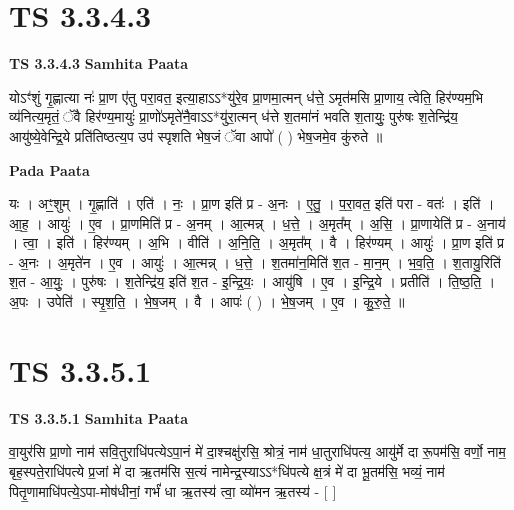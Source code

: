 \documentclass[17pt]{extarticle}
\begin{document}
\section*{ TS 3.3.4.3 }

\textbf{TS 3.3.4.3 } \newline
\textbf{Samhita Paata} \newline

योऽꣳ॑शुं गृ॒ह्णात्या नः॑ प्रा॒ण ए॑तु परा॒वत॒ इत्या॒हाऽऽ*यु॑रे॒व प्रा॒णमा॒त्मन् ध॑त्ते॒ ऽमृत॑मसि प्रा॒णाय॒ त्वेति॒ हिर॑ण्यम॒भि व्य॑नित्य॒मृतं॒ ॅवै हिर॑ण्य॒मायुः॑ प्रा॒णो॑ऽमृते॑नै॒वाऽऽ*यु॑रा॒त्मन् ध॑त्ते श॒तमा॑नं भवति श॒तायुः॒ पुरु॑षः श॒तेन्द्रि॑य॒ आयु॑ष्ये॒वेन्द्रि॒ये प्रति॑तिष्ठत्य॒प उप॑ स्पृशति भेष॒जं ॅवा आपो॑ ( ) भेष॒जमे॒व कु॑रुते ॥ \newline

\textbf{Pada Paata} \newline

यः । अꣳ॒॒शुम् । गृ॒ह्णाति॑ । एति॑ । नः॒ । प्रा॒ण इति॑ प्र - अ॒नः । ए॒तु॒ । प॒रा॒वत॒ इति॑ परा - वतः॑ । इति॑ । आ॒ह॒ । आयुः॑ । ए॒व । प्रा॒णमिति॑ प्र - अ॒नम् । आ॒त्मन्न् । ध॒त्ते॒ । अ॒मृत᳚म् । अ॒सि॒ । प्रा॒णायेति॑ प्र - अ॒नाय॑ । त्वा॒ । इति॑ । हिर॑ण्यम् । अ॒भि । वीति॑ । अ॒नि॒ति॒ । अ॒मृत᳚म् । वै । हिर॑ण्यम् । आयुः॑ । प्रा॒ण इति॑ प्र - अ॒नः । अ॒मृते॑न । ए॒व । आयुः॑ । आ॒त्मन्न् । ध॒त्ते॒ । श॒तमा॑न॒मिति॑ श॒त - मा॒न॒म् । भ॒व॒ति॒ । श॒तायु॒रिति॑ श॒त - आ॒युः॒ । पुरु॑षः । श॒तेन्द्रि॑य॒ इति॑ श॒त - इ॒न्द्रि॒यः॒ । आयु॑षि । ए॒व । इ॒न्द्रि॒ये । प्रतीति॑ । ति॒ष्ठ॒ति॒ । अ॒पः । उपेति॑ । स्पृ॒श॒ति॒ । भे॒ष॒जम् । वै । आपः॑ ( ) । भे॒ष॒जम् । ए॒व । कु॒रु॒ते॒ ॥  \newline




\section*{ TS 3.3.5.1 }

\textbf{TS 3.3.5.1 } \newline
\textbf{Samhita Paata} \newline

वा॒युर॑सि प्रा॒णो नाम॑ सवि॒तुराधि॑पत्येऽपा॒नं मे॑ दा॒श्चक्षु॑रसि॒ श्रोत्रं॒ नाम॑ धा॒तुराधि॑पत्य॒ आयु॑र्मे दा रू॒पम॑सि॒ वर्णो॒ नाम॒ बृह॒स्पते॒राधि॑पत्ये प्र॒जां मे॑ दा ऋ॒तम॑सि स॒त्यं नामेन्द्र॒स्याऽऽ*धि॑पत्ये क्ष॒त्रं मे॑ दा भू॒तम॑सि॒ भव्यं॒ नाम॑ पितृ॒णामाधि॑पत्ये॒ऽपा-मोष॑धीनां॒ गर्भं॑ धा ऋ॒तस्य॑ त्वा॒ व्यो॑मन ऋ॒तस्य॑ - [  ] \newline
\end{document}
